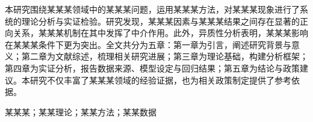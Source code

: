 \documentclass[12pt,openright]{book}
\begin{document}

\begin{zhaiyao}
本研究围绕某某某领域中的某某某问题，运用某某某方法，对某某某现象进行了系统的理论分析与实证检验。研究发现，某某某因素与某某某结果之间存在显著的正向关系，某某某机制在其中发挥了中介作用。此外，异质性分析表明，某某某影响在某某某条件下更为突出。全文共分为五章：第一章为引言，阐述研究背景与意义；第二章为文献综述，梳理相关研究进展；第三章为理论基础，构建分析框架；第四章为实证分析，报告数据来源、模型设定与回归结果；第五章为结论与政策建议。本研究不仅丰富了某某某领域的经验证据，也为相关政策制定提供了参考依据。
\end{zhaiyao}

\begin{guanjianci}
某某某；某某理论；某某方法；某某数据
\end{guanjianci}

\begin{abstract}
This study investigates the XX phenomenon in the field of XX by employing the XX method. The findings reveal a significant positive relationship between XX and XX, mediated by the XX mechanism. Heterogeneity analysis further indicates that the effect is more pronounced under XX conditions. The paper is organized into five chapters: Chapter 1 introduces the background and significance; Chapter 2 reviews the literature; Chapter 3 establishes the theoretical framework; Chapter 4 presents the data, model, and empirical results; Chapter 5 concludes and provides policy recommendations. This study contributes new empirical evidence to the XX field and offers insights for relevant policy design.
\end{abstract}
\end{document}
